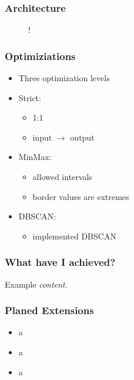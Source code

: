 \documentclass[10pt,xcolor=pdflatex]{beamer}
\begin{document}
\begin{frame}\frametitle{Architecture}
  \begin{figure}[h]
  \centering
  \resizebox {\textwidth} {!} {
    
  }
  \label{fig:tikz:architecture}
\end{figure}
\end{frame}

\begin{frame}\frametitle{Optimiziations}

  \begin{itemize}
    \item Three optimization levels
  \end{itemize}
  \vspace{1cm}

  \begin{itemize}
    \item Strict:
    \begin{itemize}
      \item 1:1
      \item input $\rightarrow$ output
    \end{itemize}
    \item MinMax:
    \begin{itemize}
      \item allowed intervals
      \item border values are extremes
    \end{itemize}
    \item DBSCAN:
    \begin{itemize}
      \item implemented DBSCAN\cite{Mahesh_Kumar2016, Schubert:2017:DRR:3129336.3068335}
    \end{itemize}
  \end{itemize}
\end{frame}

\begin{frame}\frametitle{What have I achieved?}
    Example \emph{content}.
\end{frame}

\begin{frame}\frametitle{Planed Extensions}
  \begin{itemize}
    \item a
    \item a
    \item a
  \end{itemize}
\end{frame}
\end{document}
